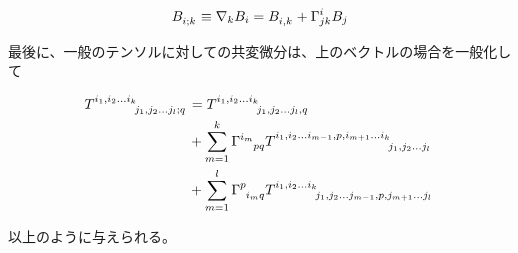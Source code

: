 \documentclass[dvipdfmx]{report} %
\begin{document}
\begin{tcolorbox}[title=共変ベクトルに対する共変微分]
\begin{equation*}
\begin{split}
\tensor{B}{_{i}_{;k}} \equiv \nabla_k B_i = \tensor{B}{_i_{,k}} + \Gamma^{i}_{jk}B_j
\end{split}
\end{equation*}
\end{tcolorbox}
最後に、一般のテンソルに対しての共変微分は、上のベクトルの場合を一般化して
\begin{tcolorbox}[title=一般のテンソルに対する共変微分]
\begin{equation*}
\begin{split}
\tensor{T}{^{i_1, i_2...i_k}_{j_1, j_2...j_l;q}} &= \tensor{T}{^{i_1, i_2...i_k}_{j_1, j_2...j_l,q}}\\
&+\sum^{k}_{m=1} \tensor{\Gamma}{^{i_m}_{pq}} \tensor{T}{^{i_1,i_2...i_{m-1},p,i_{m+1}...i_k}_{j_1, j_2...j_l}}\\
&+ \sum^{l}_{m=1} \tensor{\Gamma}{^{p}_{i_m q}} \tensor{T}{^{i_1,i_2...i_k}_{j_1, j_2...j_{m-1},p,j_{m+1}...j_l}}
\end{split}
\end{equation*}
\end{tcolorbox}
以上のように与えられる。
\end{document}
